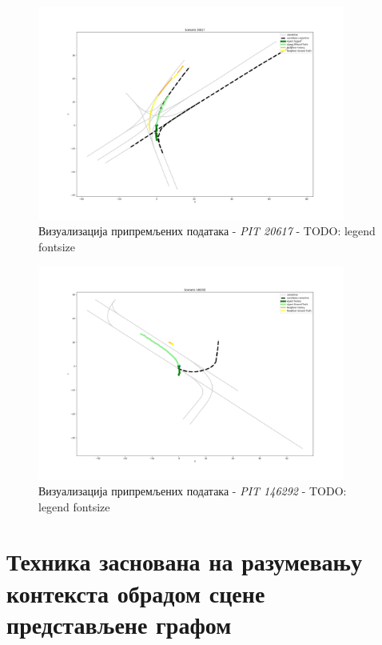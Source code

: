 \documentclass[11pt,oneside]{memoir}
\begin{document}
\begin{figure}[H]
  \includegraphics[width=0.9\textwidth]{images/scenario_PIT_20617.png}
  \caption{Визуализација припремљених података - \textit{PIT 20617} - TODO: legend fontsize}
  \label{scenario-example-PIT-20617}
\end{figure}

\begin{figure}[H]
  \includegraphics[width=0.9\textwidth]{images/scenario_PIT_146292.png}
  \caption{Визуализација припремљених података - \textit{PIT 146292} - TODO: legend fontsize}
  \label{scenario-example-PIT-146292}
\end{figure}

\chapter{Техника заснована на разумевању контекста обрадом сцене представљене графом}
\label{chp:razrada}
\end{document}
